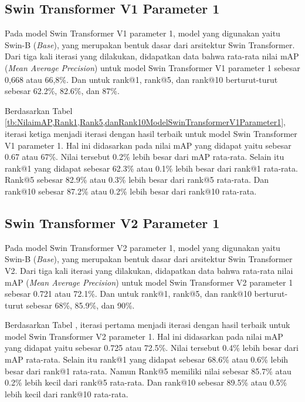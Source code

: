 \subsection{Swin Transformer V1 Parameter 1}

Pada model Swin Transformer V1 parameter 1, model yang digunakan yaitu Swin-B (\emph{Base}), yang merupakan bentuk 
dasar dari arsitektur Swin Transformer. Dari tiga kali iterasi yang dilakukan, didapatkan data bahwa rata-rata nilai 
mAP (\emph{Mean Average Precision}) untuk model Swin Transformer V1 parameter 1 sebesar 0,668 atau 66,8\%. Dan untuk 
rank@1, rank@5, dan rank@10 berturut-turut sebesar 62.2\%, 82.6\%, dan 87\%. 

Berdasarkan Tabel \ref{tb:NilaimAP,Rank1,Rank5,danRank10ModelSwinTransformerV1Parameter1}, iterasi ketiga menjadi 
iterasi dengan hasil terbaik untuk model Swin Transformer V1 parameter 1. 
Hal ini didasarkan pada nilai mAP yang didapat yaitu sebesar 0.67 atau 67\%. Nilai tersebut 0.2\% lebih besar dari 
mAP rata-rata. Selain itu rank@1 yang didapat sebesar 62.3\% atau 0.1\% lebih besar dari rank@1 rata-rata. Rank@5 sebesar 
82.9\% atau 0.3\% lebih besar dari rank@5 rata-rata. Dan rank@10 sebesar 87.2\% atau 0.2\% lebih besar dari rank@10 
rata-rata.

\subsection{Swin Transformer V2 Parameter 1}

Pada model Swin Transformer V2 parameter 1, model yang digunakan yaitu Swin-B (\emph{Base}), yang merupakan bentuk 
dasar dari arsitektur Swin Transformer V2. Dari tiga kali iterasi yang dilakukan, didapatkan data bahwa rata-rata nilai 
mAP (\emph{Mean Average Precision}) untuk model Swin Transformer V2 parameter 1 sebesar 0.721 atau 72.1\%. Dan untuk 
rank@1, rank@5, dan rank@10 berturut-turut sebesar 68\%, 85.9\%, dan 90\%. 

Berdasarkan Tabel , iterasi pertama menjadi 
iterasi dengan hasil terbaik untuk model Swin Transformer V2 parameter 1. 
Hal ini didasarkan pada nilai mAP yang didapat yaitu sebesar 0.725 atau 72.5\%. Nilai tersebut 0.4\% lebih besar dari 
mAP rata-rata. Selain itu rank@1 yang didapat sebesar 68.6\% atau 0.6\% lebih besar dari rank@1 rata-rata. Namun 
Rank@5 memiliki nilai sebesar 85.7\% atau 0.2\% lebih kecil dari rank@5 rata-rata. Dan rank@10 sebesar 89.5\% atau 0.5\% 
lebih kecil dari rank@10 rata-rata.

